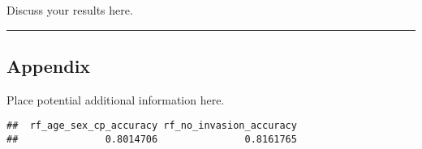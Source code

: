 \documentclass[
]{article}
\begin{document}
Discuss your results here.

\begin{center}\rule{0.5\linewidth}{0.5pt}\end{center}

\hypertarget{appendix}{%
\subsection{Appendix}\label{appendix}}

Place potential additional information here.

\begin{verbatim}
##  rf_age_sex_cp_accuracy rf_no_invasion_accuracy 
##               0.8014706               0.8161765
\end{verbatim}
\end{document}
